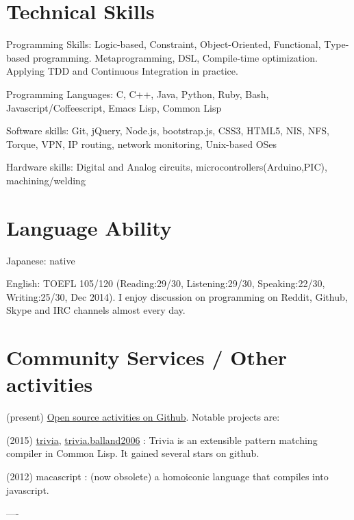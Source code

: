 \documentclass[letterpaper]{article}
\begin{document}
\section{Technical Skills}

\begin{CV}
 \item[Programming Skills:] Logic-based, Constraint, Object-Oriented,
 Functional, Type-based programming. Metaprogramming, DSL,
 Compile-time optimization. Applying TDD and Continuous Integration in practice.
 \item[Programming Languages:] C, C++, Java, Python, Ruby, Bash,
 Javascript/Coffeescript, Emacs Lisp, Common Lisp
 \item[Software skills:] Git, jQuery, Node.js, bootstrap.js, CSS3,
 HTML5, NIS, NFS, Torque, VPN, IP routing, network monitoring, Unix-based OSes
 \item[Hardware skills:] Digital and Analog circuits, microcontrollers(Arduino,PIC), machining/welding
\end{CV}

\section{Language Ability}

\begin{CV}
 \item[Japanese:] native
 \item[English:] TOEFL 105/120 (Reading:29/30, Listening:29/30,
 Speaking:22/30, Writing:25/30, Dec 2014). I enjoy discussion
 on programming on Reddit, Github, Skype and IRC channels almost every day.
\end{CV}

\section{Community Services / Other activities}

(present) \href{https://github.com/guicho271828}{Open source
activities on Github}. Notable projects are:

(2015) \href{https://github.com/guicho271828/trivia}{trivia},
\href{https://github.com/guicho271828/trivia.balland2006}{trivia.balland2006}
: Trivia is an extensible pattern matching compiler in Common Lisp. It gained several stars on github.

(2012) macascript : (now obsolete) a homoiconic language that compiles
into javascript.

----
\end{document}
